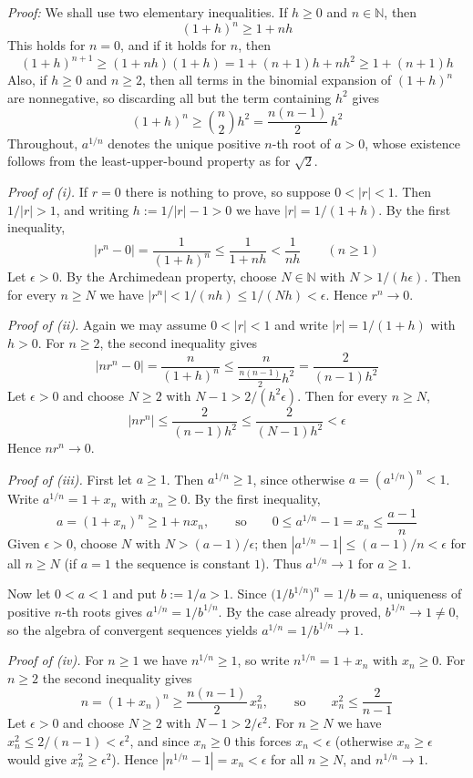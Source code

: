\documentclass[a4paper,11pt,abstracton]{scrartcl}
\newcommand{\NN}{\mathbb{N}}
\theoremstyle{dotlessP}
\theoremstyle{dotlessS}
\theoremstyle{remark}
\theoremstyle{definition}
\begin{document}
\begin{claim_box}
\textit{Proof:}
We shall use two elementary inequalities. If $h\ge0$ and $n\in\NN$, then
\[
    (1+h)^n\ge1+nh
\]
This holds for $n=0$, and if it holds for $n$, then
\[
    (1+h)^{n+1}\ge(1+nh)(1+h)=1+(n+1)h+nh^2\ge1+(n+1)h
\]
Also, if $h\ge0$ and $n\ge2$, then all terms in the binomial expansion of $(1+h)^n$ are nonnegative, so discarding all but the term containing $h^2$ gives
\[
    (1+h)^n\ge\binom n2h^2=\frac{n(n-1)}2\,h^2
\]
Throughout, $a^{1/n}$ denotes the unique positive $n$-th root of $a>0$, whose existence follows from the least-upper-bound property as for $\sqrt2$.

\textit{Proof of (i).}
If $r=0$ there is nothing to prove, so suppose $0<|r|<1$. Then $1/|r|>1$, and writing $h:=1/|r|-1>0$ we have $|r|=1/(1+h)$. By the first inequality,
\[
    |r^n-0|=\frac1{(1+h)^n}\le\frac1{1+nh}<\frac1{nh}\qquad(n\ge1)
\]
Let $\epsilon>0$. By the Archimedean property, choose $N\in\NN$ with $N>1/(h\epsilon)$. Then for every $n\ge N$ we have $|r^n|<1/(nh)\le 1/(Nh)<\epsilon$. Hence $r^n\to0$.

\textit{Proof of (ii).}
Again we may assume $0<|r|<1$ and write $|r|=1/(1+h)$ with $h>0$. For $n\ge2$, the second inequality gives
\[
    |nr^n-0|=\frac n{(1+h)^n}\le\frac{n}{\frac{n(n-1)}{2}h^2}=\frac2{(n-1)h^2}
\]
Let $\epsilon>0$ and choose $N\ge2$ with $N-1>2/(h^2\epsilon)$. Then for every $n\ge N$,
\[
    |nr^n|\le\frac2{(n-1)h^2}\le\frac2{(N-1)h^2}<\epsilon
\]
Hence $nr^n\to0$.

\textit{Proof of (iii).}
First let $a\ge1$. Then $a^{1/n}\ge1$, since otherwise $a=(a^{1/n})^n<1$. Write $a^{1/n}=1+x_n$ with $x_n\ge0$. By the first inequality,
\[
    a=(1+x_n)^n\ge1+nx_n,
    \qquad\text{so}\qquad
    0\le a^{1/n}-1=x_n\le\frac{a-1}n
\]
Given $\epsilon>0$, choose $N$ with $N>(a-1)/\epsilon$; then $|a^{1/n}-1|\le(a-1)/n<\epsilon$ for all $n\ge N$ (if $a=1$ the sequence is constant $1$). Thus $a^{1/n}\to1$ for $a\ge1$.

Now let $0<a<1$ and put $b:=1/a>1$. Since $\bigl(1/b^{1/n}\bigr)^n=1/b=a$, uniqueness of positive $n$-th roots gives $a^{1/n}=1/b^{1/n}$. By the case already proved, $b^{1/n}\to1\ne0$, so the algebra of convergent sequences yields $a^{1/n}=1/b^{1/n}\to1$.

\textit{Proof of (iv).}
For $n\ge1$ we have $n^{1/n}\ge1$, so write $n^{1/n}=1+x_n$ with $x_n\ge0$. For $n\ge2$ the second inequality gives
\[
    n=(1+x_n)^n\ge\frac{n(n-1)}2\,x_n^2,
    \qquad\text{so}\qquad
    x_n^2\le\frac2{n-1}
\]
Let $\epsilon>0$ and choose $N\ge2$ with $N-1>2/\epsilon^2$. For $n\ge N$ we have $x_n^2\le 2/(n-1)<\epsilon^2$, and since $x_n\ge0$ this forces $x_n<\epsilon$ (otherwise $x_n\ge\epsilon$ would give $x_n^2\ge\epsilon^2$). Hence $|n^{1/n}-1|=x_n<\epsilon$ for all $n\ge N$, and $n^{1/n}\to1$.


\end{claim_box}
\end{document}
